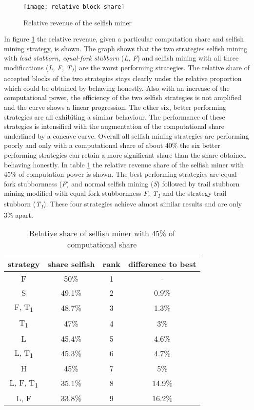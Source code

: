 \begin{figure}[t]
\texttt{[image: relative\_block\_share]}
\centering
\caption{Relative revenue of the selfish miner}
\label{fig:relative_block_share}
\end{figure}

In figure \ref{fig:relative_block_share} the relative revenue, given a particular computation share and selfish mining strategy, is shown.
The graph shows that the two strategies selfish mining with \textit{lead stubborn, equal-fork stubborn} (\textit{L, F}) and selfish mining with all three modifications (\textit{L, F, T\textsubscript{1}}) are the worst performing strategies.
The relative share of accepted blocks of the two strategies stays clearly under the relative proportion which could be obtained by behaving honestly.
Also with an increase of the computational power, the efficiency of the two selfish strategies is not amplified and the curve shows a linear progression.
The other six, better performing strategies are all exhibiting a similar behaviour.
The performance of these strategies is intensified with the augmentation of the computational share underlined by a concave curve.
Overall all selfish mining strategies are performing poorly and only with a computational share of about 40\% the six better performing strategies can retain a more significant share than the share obtained behaving honestly.
In table \ref{tab:relative_share_45} the relative  revenue share of the selfish miner with 45\% of computation power is shown.
The best performing strategies are equal-fork stubbornness (\textit{F}) and normal selfish mining (\textit{S}) followed by trail stubborn mining modified with equal-fork stubbornness \textit{F, T\textsubscript{1}} and the strategy trail stubborn (\textit{T\textsubscript{1}}).
These four strategies achieve almost similar results and are only 3\% apart.

\begin{table}
  \centering
  \begin{tabular}{cccc}
    \toprule
    strategy & share selfish & rank & difference to best\\
    \midrule
    F & 50\% & 1 & - \\
    S & 49.1\% & 2 & 0.9\% \\
    F, T\textsubscript{1} & 48.7\% & 3 & 1.3\% \\
    T\textsubscript{1} & 47\% & 4 & 3\% \\
    L & 45.4\% & 5 & 4.6\% \\
    L, T\textsubscript{1} & 45.3\% & 6 & 4.7\% \\
    H & 45\% & 7 & 5\% \\
    L, F, T\textsubscript{1} & 35.1\% & 8 & 14.9\% \\
    L, F & 33.8\% & 9 & 16.2\% \\
    \bottomrule
  \end{tabular}
  \caption{Relative share of selfish miner with 45\% of computational share}
  \label{tab:relative_share_45}
\end{table}

